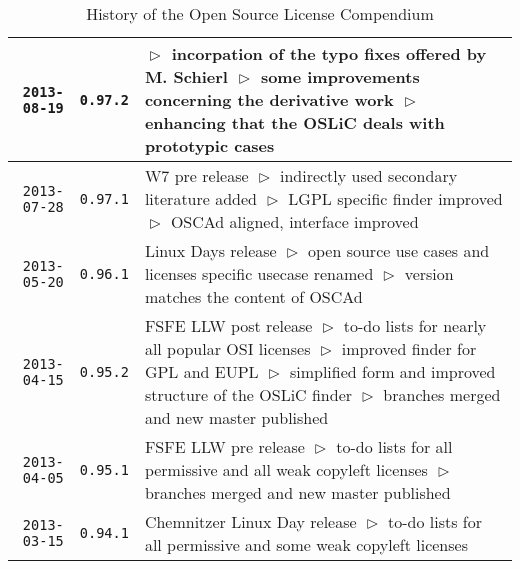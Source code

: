 \begin{table}
\footnotesize
\caption{History of the Open Source License Compendium}
\begin{center}
\begin{tabular}{|r|c|p{9.4cm}|}
\hline
\hline
    \texttt{2013-08-19}
  & \texttt{0.97.2}
  & $\vartriangleright$ incorpation of the typo fixes offered by M.
    Schierl\newline
  $\vartriangleright$ some improvements concerning the derivative work\newline
  $\vartriangleright$ enhancing that the OSLiC deals with prototypic cases\\
\hline
    \texttt{2013-07-28}
  & \texttt{0.97.1} 
  & W7 pre release\newline
    $\vartriangleright$ indirectly used secondary literature added\newline
    $\vartriangleright$ LGPL specific finder improved\newline
    $\vartriangleright$ OSCAd aligned, interface improved\\
\hline
    \texttt{2013-05-20}
  & \texttt{0.96.1} 
  & Linux Days release\newline    
    $\vartriangleright$ open source use cases and licenses specific usecase renamed\newline
    $\vartriangleright$ version matches the content of OSCAd\\
\hline
    \texttt{2013-04-15}
  & \texttt{0.95.2} 
  & FSFE LLW post release\newline
    $\vartriangleright$ to-do lists for nearly all popular OSI licenses\newline
    $\vartriangleright$ improved finder for GPL and EUPL\newline
    $\vartriangleright$ simplified form and improved structure of the OSLiC finder\newline    
    $\vartriangleright$ branches merged and new master published\\
\hline
    \texttt{2013-04-05}
  & \texttt{0.95.1} 
  & FSFE LLW pre release\newline
    $\vartriangleright$ to-do lists for all permissive and all weak copyleft licenses\newline
    $\vartriangleright$ branches merged and new master published\\
\hline
    \texttt{2013-03-15}
  & \texttt{0.94.1} 
  & Chemnitzer Linux Day release\newline
    $\vartriangleright$ to-do lists for all permissive and some weak copyleft licenses\newline

\end{tabular}
\end{center}
\end{table}
